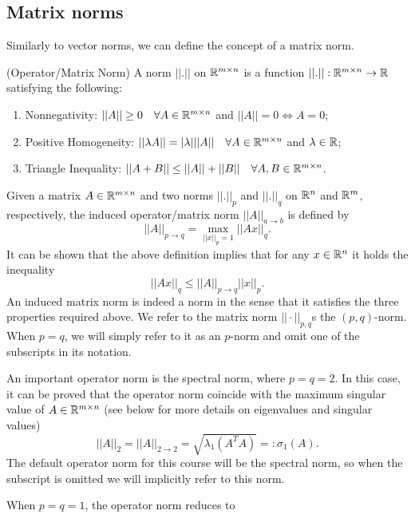 \documentclass[10pt,a4paper]{article}
\begin{document}
\subsection{Matrix norms}
Similarly to vector norms, we can define the concept of a matrix norm.
\begin{definition} (Operator/Matrix Norm)
	A norm $||.||$ on $\mathbb{R}^{m\times n}$ is a function $||.||:\mathbb{R}^{m\times n} \to \mathbb{R}$ satisfying the following:
	\begin{enumerate}
		\item Nonnegativity: $||A|| \geq 0 \quad \forall A \in \mathbb{R}^{m\times n}$ and $||A|| = 0 \Leftrightarrow A =0$;
		\item Positive Homogeneity:  $||\lambda A|| = |\lambda| ||A|| \quad \forall A \in \mathbb{R}^{m\times n}$ and $\lambda\in \mathbb{R}$;
		\item Triangle Inequality: $||A+B|| \leq ||A|| + ||B|| \quad \forall A,B \in \mathbb{R}^{m\times n}$.
	\end{enumerate}
\end{definition}
Given a matrix $A\in \mathbb{R}^{m\times n}$ and two norms $||.||_p$ and $||.||_q$ on $\mathbb{R}^n$ and $\mathbb{R}^m$, respectively, the induced operator/matrix norm $||A||_{a\to b}$ is defined by
\begin{equation*}
	||A||_{p\to q} = \max_{||x||_p=1} ||Ax||_q. 
\end{equation*}
It can be shown that the above definition implies that for any $x \in \mathbb{R}^n$ it holds the inequality
\begin{equation*}
	||Ax||_q \leq ||A||_{p\to q} ||x||_p.
\end{equation*}
An induced matrix norm is indeed a norm in the sense that it satisfies the three properties required above. We refer to the matrix norm $||\cdot||_{p,q}$s the $(p, q)$-norm. When $p=q$, we will simply refer to it as an $p$-norm and omit one of the subscripts in its notation.
\par An important operator norm is the spectral norm, where $p=q=2$. In this case, it can be proved that the operator norm coincide with the maximum singular value of $A \in \mathbb{R}^{m\times n}$ (see below for more details on eigenvalues and singular values)
\begin{equation*}
	||A||_2 = ||A||_{2\to2} = \sqrt{\lambda_1 (A^TA)} =: \sigma_1 (A).
\end{equation*}
The default operator norm for this course will be the spectral norm, so when the subscript is omitted we will implicitly refer to this norm.
\par When $p=q=1$, the operator norm reduces to 
\end{document}

